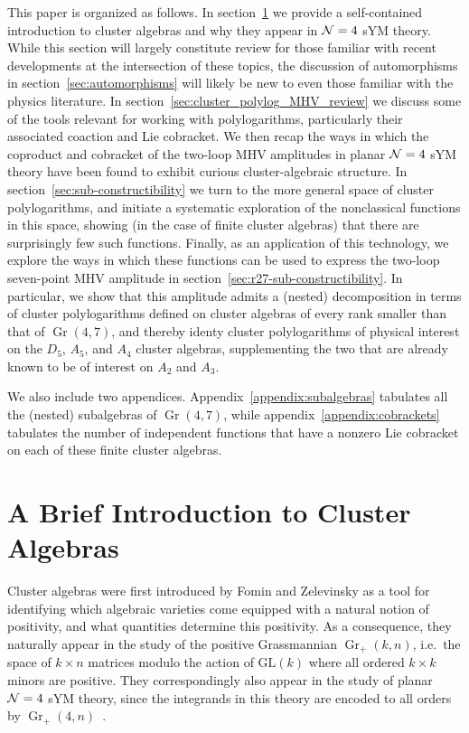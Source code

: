 \documentclass[12pt]{article}
\DeclareMathOperator{\Gr}{Gr}
\begin{document}
This paper is organized as follows. In section~\ref{sec:brief_intro} we provide a self-contained introduction to cluster algebras and why they appear in ${\cal N} =4$ sYM theory. While this section will largely constitute review for those familiar with recent developments at the intersection of these topics, the discussion of automorphisms in section~\ref{sec:automorphisms} will likely be new to even those familiar with the physics literature. In section~\ref{sec:cluster_polylog_MHV_review} we discuss some of the tools relevant for working with polylogarithms, particularly their associated coaction and Lie cobracket. We then recap the ways in which the coproduct and cobracket of the two-loop MHV amplitudes in planar ${\cal N} =4$ sYM theory have been found to exhibit curious cluster-algebraic structure. In section~\ref{sec:sub-constructibility} we turn to the more general space of cluster polylogarithms, and initiate a systematic exploration of the nonclassical functions in this space, showing (in the case of finite cluster algebras) that there are surprisingly few such functions. Finally, as an application of this technology, we explore the ways in which these functions can be used to express the two-loop seven-point MHV amplitude in section~\ref{sec:r27-sub-constructibility}. In particular, we show that this amplitude admits a (nested) decomposition in terms of cluster polylogarithms defined on cluster algebras of every rank smaller than that of $\Gr(4,7)$, and thereby identy cluster polylogarithms of physical interest on the $D_5$, $A_5$, and $A_4$ cluster algebras, supplementing the two that are already known to be of interest on $A_2$ and $A_3$. 

We also include two appendices. Appendix~\ref{appendix:subalgebras} tabulates all the (nested) subalgebras of $\Gr(4,7)$, while appendix~\ref{appendix:cobrackets} tabulates the number of independent functions that have a nonzero Lie cobracket on each of these finite cluster algebras.

\section{A Brief Introduction to Cluster Algebras} \label{sec:brief_intro}

Cluster algebras were first introduced by Fomin and Zelevinsky \cite{1021.16017} as a tool for identifying which algebraic varieties come equipped with a natural notion of positivity, and what quantities determine this positivity. As a consequence, they naturally appear in the study of the positive Grassmannian $\Gr_{+}(k,n)$, i.e.~the space of $k\times n$ matrices modulo the action of $\text{GL}(k)$ where all ordered $k\times k$ minors are positive. They correspondingly also appear in the study of planar ${\cal N} = 4$ sYM theory, since the integrands in this theory are encoded to all orders by $\Gr_+(4,n)$~\cite{ArkaniHamed:2012nw}.
\end{document}
